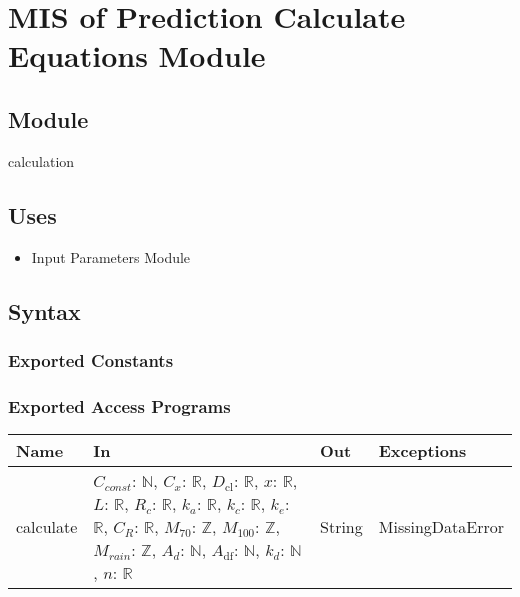 \documentclass[12pt, titlepage]{article}
\begin{document}
\section{MIS of Prediction Calculate Equations Module}

\subsection{Module}
calculation

\subsection{Uses}
\begin{itemize}
    \item Input Parameters Module
\end{itemize}

\subsection{Syntax}

\subsubsection{Exported Constants}

\subsubsection{Exported Access Programs}

\begin{center}
\begin{tabular}{p{2cm} p{10cm} p{2cm} p{5cm}}
\hline
\textbf{Name} & \textbf{In} & \textbf{Out} & \textbf{Exceptions} \\
\hline
    calculate & 
    $C_{const}$: $\mathbb{N}$, 
    $C_x$: $\mathbb{R}$, 
    $D_\text{cl}$: $\mathbb{R}$,
    $x$: $\mathbb{R}$,
    $L$: $\mathbb{R}$, 
    $R_c$: $\mathbb{R}$,
    $k_a$: $\mathbb{R}$, 
    $k_c$: $\mathbb{R}$, 
    $k_e$: $\mathbb{R}$,
    $C_R$: $\mathbb{R}$,
    $M_{70}$: $\mathbb{Z}$,
    $M_{100}$: $\mathbb{Z}$,
    $M_{rain}$: $\mathbb{Z}$,
    $A_d$: $\mathbb{N}$,
    $A_\text{df}$: $\mathbb{N}$,
    $k_d$: $\mathbb{N}$,
    $n$: $\mathbb{R}$ 
    & String 
    & MissingDataError\\
\hline
\end{tabular}
\end{center}
\end{document}
